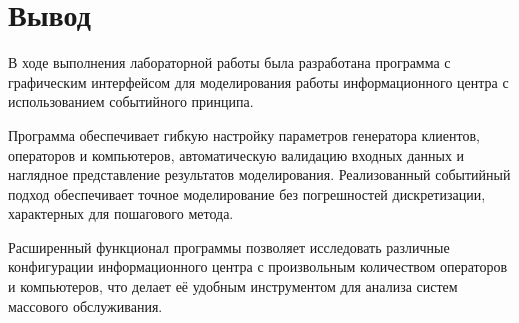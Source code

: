 \section{Вывод}

В ходе выполнения лабораторной работы была разработана программа с графическим интерфейсом для моделирования работы информационного центра с использованием событийного принципа.

Программа обеспечивает гибкую настройку параметров генератора клиентов, операторов и компьютеров, автоматическую валидацию входных данных и наглядное представление результатов моделирования. Реализованный событийный подход обеспечивает точное моделирование без погрешностей дискретизации, характерных для пошагового метода.

Расширенный функционал программы позволяет исследовать различные конфигурации информационного центра с произвольным количеством операторов и компьютеров, что делает её удобным инструментом для анализа систем массового обслуживания.

